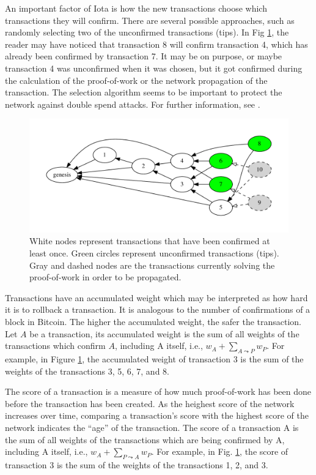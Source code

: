 An important factor of Iota is how the new transactions choose which transactions they will confirm. There are several possible approaches, such as randomly selecting two of the unconfirmed transactions (tips). In Fig \ref{fig-tangle-example}, the reader may have noticed that transaction 8 will confirm transaction 4, which has already been confirmed by transaction 7. It may be on purpose, or maybe transaction 4 was unconfirmed when it was chosen, but it got confirmed during the calculation of the proof-of-work or the network propagation of the transaction. The selection algorithm seems to be important to protect the network against double spend attacks. For further information, see \cite{tangle2016}.

\begin{figure}[ht]
\centering\includegraphics[width=\textwidth]{./images01/fig-tangle-example.pdf}
\caption{White nodes represent transactions that have been confirmed at least once. Green circles represent unconfirmed transactions (tips). Gray and dashed nodes are the transactions currently solving the proof-of-work in order to be propagated.\label{fig-tangle-example}}
\end{figure}

Transactions have an accumulated weight which may be interpreted as how hard it is to rollback a transaction. It is analogous to the number of confirmations of a block in Bitcoin. The higher the accumulated weight, the safer the transaction. Let $A$ be a transaction, its accumulated weight is the sum of all weights of the transactions which confirm $A$, including A itself, i.e., $w_A + \sum_{A \leadsto P} w_P$. For example, in Figure \ref{fig-tangle-example}, the accumulated weight of transaction 3 is the sum of the weights of the transactions 3, 5, 6, 7, and 8.

The score of a transaction is a measure of how much proof-of-work has been done before the transaction has been created. As the heighest score of the network increases over time, comparing a transaction's score with the highest score of the network indicates the ``age'' of the transaction. The score of a transaction A is the sum of all weights of the transactions which are being confirmed by A, including A itself, i.e., $w_A + \sum_{P \leadsto A} w_P$. For example, in Fig. \ref{fig-tangle-example}, the score of transaction 3 is the sum of the weights of the transactions 1, 2, and 3.

